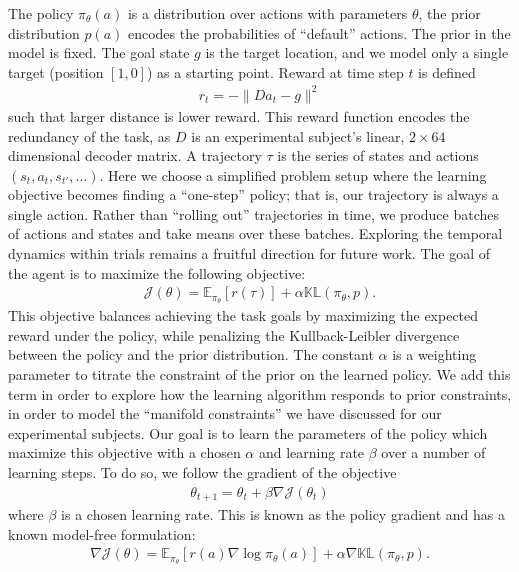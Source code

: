 \documentclass[../main.tex]{subfiles}
\begin{document}
The policy $\pi_\theta(a)$ is a distribution over actions with parameters $\theta$, the prior distribution $p(a)$ encodes the probabilities of ``default'' actions. The prior in the model is fixed. The goal state $g$ is the target location, and we model only a single target (position $[1,0]$) as a starting point. Reward at time step $t$ is defined
%
\begin{align}
  r_t = -\parallel Da_t - g \parallel^2
\end{align}
%
such that larger distance is lower reward. This reward function encodes the redundancy of the task, as $D$ is an experimental subject's linear, $2\times64$ dimensional decoder matrix. A trajectory $\tau$ is the series of states and actions $(s_t,a_t,s_{t'},\ldots)$. Here we choose a simplified problem setup where the learning objective becomes finding a ``one-step'' policy; that is, our trajectory is always a single action. Rather than ``rolling out'' trajectories in time, we produce batches of actions and states and take means over these batches. Exploring the temporal dynamics within trials remains a fruitful direction for future work. The goal of the agent is to maximize the following objective:
%
\begin{align}
  \mathcal{J}(\theta) = \mathbb{E}_{{\pi}_\theta}[{r(\tau)}] + \alpha\mathbb{KL}(\pi_\theta,p).
\end{align}
%
This objective balances achieving the task goals by maximizing the expected reward under the policy, while penalizing the Kullback-Leibler divergence between the policy and the prior distribution. The constant $\alpha$ is a weighting parameter to titrate the constraint of the prior on the learned policy. We add this term in order to explore how the learning algorithm responds to prior constraints, in order to model the ``manifold constraints'' we have discussed for our experimental subjects. Our goal is to learn the parameters of the policy which maximize this objective with a chosen $\alpha$ and learning rate $\beta$ over a number of learning steps. To do so, we follow the gradient of the objective
%
\begin{align}
  \theta_{t+1} = \theta_t + \beta\nabla{\mathcal{J}(\theta_t)}
\end{align}
%
where $\beta$ is a chosen learning rate. This is known as the policy gradient and has a known model-free formulation\cite{suttonReinforcementLearningIntroduction2018}:
%
\begin{align}
  \nabla\mathcal{J}(\theta) = \mathbb{E}_{{\pi}_\theta}[{r(a)\nabla\log\pi_\theta(a)}] + \alpha\nabla\mathbb{KL}(\pi_\theta,p).
\end{align}
\end{document}
